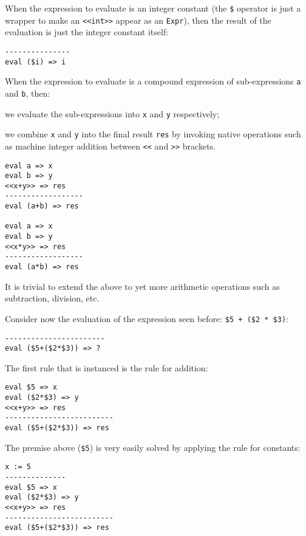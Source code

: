 When the expression to evaluate is an integer constant (the \texttt{\$} operator is just a wrapper to make an \texttt{<<int>>} appear as an \texttt{Expr}), then the result of the evaluation is just the integer constant itself:

\begin{lstlisting}
---------------
eval ($i) => i
\end{lstlisting}

When the expression to evaluate is a compound expression of sub-expressions \texttt{a} and \texttt{b}, then: \begin{inparaenum}
\item we evaluate the sub-expressions into \texttt{x} and \texttt{y} respectively;
\item we combine \texttt{x} and \texttt{y} into the final result \texttt{res} by invoking native operations such as machine integer addition between \texttt{<<} and \texttt{>>} brackets.
\end{inparaenum}

\begin{lstlisting}
eval a => x
eval b => y
<<x+y>> => res
------------------
eval (a+b) => res

eval a => x
eval b => y
<<x*y>> => res
------------------
eval (a*b) => res
\end{lstlisting}

It is trivial to extend the above to yet more arithmetic operations such as subtraction, division, etc.

Consider now the evaluation of the expression seen before: \texttt{\$5 + (\$2 * \$3)}:

\begin{lstlisting}
-----------------------
eval ($5+($2*$3)) => ?
\end{lstlisting}

The first rule that is instanced is the rule for addition:

\begin{lstlisting}
eval $5 => x
eval ($2*$3) => y
<<x+y>> => res
-------------------------
eval ($5+($2*$3)) => res
\end{lstlisting}

The premise above (\texttt{\$5}) is very easily solved by applying the rule for constants:

\begin{lstlisting}
x := 5
--------------
eval $5 => x
eval ($2*$3) => y
<<x+y>> => res
-------------------------
eval ($5+($2*$3)) => res
\end{lstlisting}

